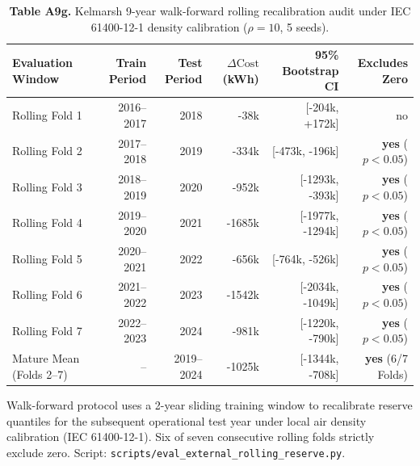 \documentclass[
  journal]{IEEEtran}
\begin{document}
\begin{table}[!t]
\centering
\fontsize{8.0pt}{9.6pt}\selectfont
\setlength{\tabcolsep}{2.5pt}
\renewcommand{\arraystretch}{1.05}
\caption*{\textbf{Table A9g.} Kelmarsh 9-year walk-forward rolling recalibration audit under IEC 61400-12-1 density calibration ($\rho=10$, 5 seeds).}
%
\begin{tabular}{lrrrrr}
\toprule
Evaluation Window & Train Period & Test Period & $\Delta\text{Cost}$ (kWh) & 95\% Bootstrap CI & Excludes Zero \\
\midrule
Rolling Fold 1 & 2016--2017 & 2018 & -38k & [-204k, +172k] & no \\
Rolling Fold 2 & 2017--2018 & 2019 & -334k & [-473k, -196k] & \textbf{yes} ($p<0.05$) \\
Rolling Fold 3 & 2018--2019 & 2020 & -952k & [-1293k, -393k] & \textbf{yes} ($p<0.05$) \\
Rolling Fold 4 & 2019--2020 & 2021 & -1685k & [-1977k, -1294k] & \textbf{yes} ($p<0.05$) \\
Rolling Fold 5 & 2020--2021 & 2022 & -656k & [-764k, -526k] & \textbf{yes} ($p<0.05$) \\
Rolling Fold 6 & 2021--2022 & 2023 & -1542k & [-2034k, -1049k] & \textbf{yes} ($p<0.05$) \\
Rolling Fold 7 & 2022--2023 & 2024 & -981k & [-1220k, -790k] & \textbf{yes} ($p<0.05$) \\
\midrule
Mature Mean (Folds 2--7) & -- & 2019--2024 & -1025k & [-1344k, -708k] & \textbf{yes} (6/7 Folds) \\
\bottomrule
\end{tabular}
\vspace{1mm}
\fontsize{8.0pt}{9.6pt}\selectfont Walk-forward protocol uses a 2-year sliding training window to recalibrate reserve quantiles for the subsequent operational test year under local air density calibration (IEC 61400-12-1). Six of seven consecutive rolling folds strictly exclude zero. Script: \texttt{scripts/eval\_external\_rolling\_reserve.py}.
\end{table}
\end{document}
